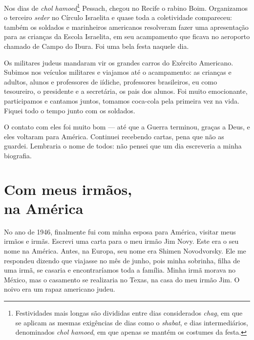 
Nos dias de \textit{chol hamoed}\footnote{Festividades mais longas são divididas
  entre dias considerados \textit{chag}, em que se aplicam as mesmas exigências
  de dias como o \textit{shabat}, e dias intermediários, denominados \textit{chol hamoed},
  em que apenas se mantém os costumes da festa.} Pessach, chegou no
Recife o rabino Boim. Organizamos o terceiro \textit{seder} no Círculo
Israelita e quase toda a coletividade compareceu: também os soldados e
marinheiros americanos resolveram fazer uma apresentação para as
crianças da Escola Israelita, em seu acampamento que ficava no aeroporto
chamado de Campo do Ibura. Foi uma bela festa naquele dia. 

Os militares judeus mandaram vir os grandes carros do Exército Americano. Subimos nos veículos militares e viajamos até o acampamento: as crianças e adultos, alunos e professores de iídiche, professores brasileiros, eu como tesoureiro, o presidente e a secretária, os pais dos alunos.
Foi muito emocionante, participamos e cantamos juntos, tomamos coca-cola pela primeira vez na
vida. Fiquei todo o tempo junto com os soldados.

O contato com eles foi muito bom --- até que a Guerra terminou, graças a
Deus, e eles voltaram para América. Continuei recebendo cartas, pena
que não as guardei. Lembraria o nome de todos: não pensei que
um dia escreveria a minha biografia.

\chapter*{Com meus irmãos,\\na América}

No ano de 1946, finalmente fui com minha esposa para América, visitar
meus irmãos e irmãs. Escrevi uma carta para o meu irmão Jim Novy. Este
era o seu nome na América. Antes, na Europa, seu nome era Shimen
Novodvorsky. Ele me respondeu dizendo que viajasse no mês de junho,
pois minha sobrinha, filha de uma irmã, se casaria e encontraríamos
toda a família. Minha irmã morava no México, mas o casamento
se realizaria no Texas, na casa do meu irmão Jim. O noivo era um rapaz
americano judeu.

